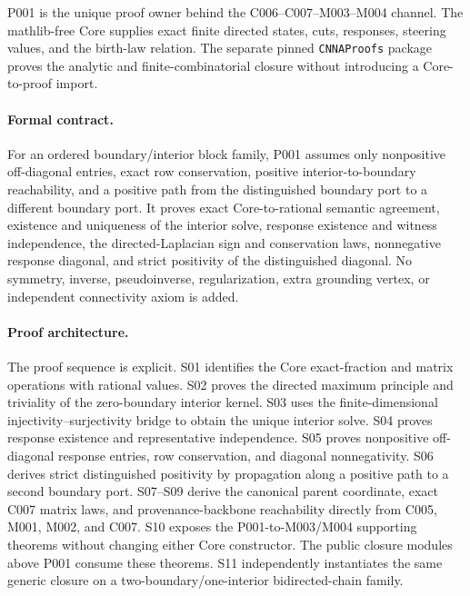 P001 is the unique proof owner behind the C006--C007--M003--M004 channel.
The mathlib-free Core supplies exact finite directed states, cuts, responses,
steering values, and the birth-law relation.  The separate pinned
\texttt{CNNAProofs} package proves the analytic and finite-combinatorial
closure without introducing a Core-to-proof import.

\paragraph*{Formal contract.}
For an ordered boundary/interior block family, P001 assumes only
nonpositive off-diagonal entries, exact row conservation, positive
interior-to-boundary reachability, and a positive path from the distinguished
boundary port to a different boundary port.  It proves exact Core-to-rational
semantic agreement, existence and uniqueness of the interior solve, response
existence and witness independence, the directed-Laplacian sign and
conservation laws, nonnegative response diagonal, and strict positivity of the
distinguished diagonal.  No symmetry, inverse, pseudoinverse, regularization,
extra grounding vertex, or independent connectivity axiom is added.

\paragraph*{Proof architecture.}
The proof sequence is explicit.  S01 identifies the Core exact-fraction and
matrix operations with rational values.  S02 proves the directed maximum
principle and triviality of the zero-boundary interior kernel.  S03 uses the
finite-dimensional injectivity--surjectivity bridge to obtain the unique
interior solve.  S04 proves response existence and representative
independence.  S05 proves nonpositive off-diagonal response entries, row
conservation, and diagonal nonnegativity.  S06 derives strict distinguished
positivity by propagation along a positive path to a second boundary port.
S07--S09 derive the canonical parent coordinate, exact C007 matrix laws, and
provenance-backbone reachability directly from C005, M001, M002, and C007.
S10 exposes the P001-to-M003/M004 supporting theorems without changing either Core
constructor.  The public closure modules above P001 consume these theorems.  S11 independently instantiates the same generic closure on a
two-boundary/one-interior bidirected-chain family.

